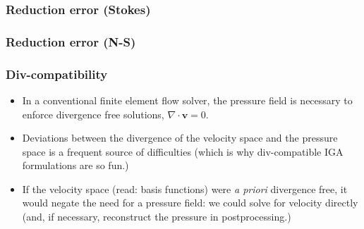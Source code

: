 \documentclass{beamer}
\begin{document}
\begin{frame}
  \frametitle{Reduction error (Stokes)}
  \begin{center}
  \end{center}
\end{frame}

\begin{frame}
  \frametitle{Reduction error (N-S)}
  \begin{center}
  \end{center}
\end{frame}

\begin{frame}
  \frametitle{Div-compatibility}
  \begin{itemize}
  \item In a conventional finite element flow solver, the pressure field is
    necessary to enforce divergence free solutions, $\nabla \cdot \bm v = 0$.
  \item Deviations between the divergence of the velocity space and the pressure
    space is a frequent source of difficulties
    (which is why div-compatible IGA formulations are so fun.)
  \item If the velocity space (read: basis functions) were \emph{a priori}
    divergence free, it would negate the need for a pressure field: we could
    solve for velocity directly (and, if necessary, reconstruct the pressure in
    postprocessing.)
  \end{itemize}
\end{frame}
\end{document}
